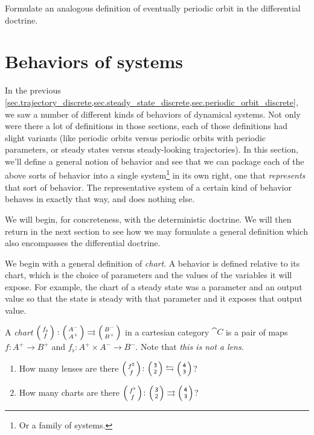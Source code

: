 \documentclass[DynamicalBook]{subfiles}
\begin{document}
\begin{exercise}
  Formulate an analogous definition of eventually periodic orbit in the
  differential doctrine.
\end{exercise}








\section{Behaviors of systems}\label{sec.behaviors}

In the previous
\cref{sec.trajectory_discrete,sec.steady_state_discrete,sec.periodic_orbit_discrete},
we saw a number of different kinds of behaviors of dynamical systems. Not only
were there a lot of definitions in those sections, each of those definitions had
slight variants (like periodic orbits versus periodic orbits with periodic
parameters, or steady states versus steady-looking trajectories). In this
section, we'll define a general notion of behavior and see that we can package
each of the above sorts of behavior into a single system\footnote{Or a family of
systems.} in its own right, one that \emph{represents} that sort of
behavior. The representative system of a certain kind of behavior behaves in
exactly that way, and does nothing else.

We will begin, for concreteness, with the deterministic doctrine. We will then
return in the next section to see how we may formulate a general definition
which also encompasses the differential doctrine.

We begin with a general definition of \emph{chart}. A behavior is defined
relative to its chart, which is the choice of parameters and the values of the
variables it will expose. For example, the chart of a steady state was a
parameter and an output value so that the state is steady with that parameter
and it exposes that output value.

\begin{definition}\label{def.chart_discrete}
  A \emph{chart} $\lens{f_{\flat}}{f} : \lens{A^-}{A^+} \rightrightarrows
  \lens{B^-}{B^+}$ in a cartesian category $\cat{C}$ is a pair of maps $f : A^+ \to B^+$ and $f_{\flat} : A^+
  \times A^- \to B^-$. Note that \emph{this is not a lens}.
\end{definition}

\begin{exercise}
\begin{enumerate}
	\item How many lenses are there $\lens{f^\sharp}{f}\colon\lens{\3}{\2}\fromto\lens{\4}{\3}$?
	\item How many charts are there $\lens{f^\flat}{f}\colon\lens{\3}{\2}\tto\lens{\4}{\3}$?
\qedhere
\end{enumerate}
\end{exercise}
\end{document}
